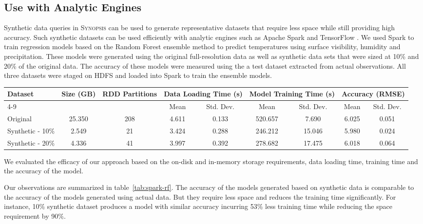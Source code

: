 \subsection{Use with Analytic Engines}
Synthetic data queries in \textsc{Synopsis} can be used to generate representative datasets that require less space while still providing high accuracy.  
Such synthetic datasets can be used efficiently with analytic engines such as Apache Spark \cite{zaharia2010spark} and TensorFlow \cite{tensorflow}.  
We used Spark to train regression models based on the Random Forest ensemble method to predict temperatures using surface visibility, humidity and precipitation.
These models were generated using the original full-resolution data as well as synthetic data sets that were sized at 10\% and 20\% of the original data.
The accuracy of these models were measured using the a test dataset extracted from actual observations.
All three datasets were staged on HDFS and loaded into Spark to train the ensemble models.
%
\begin{table*}
    \renewcommand{\arraystretch}{1.3}
    \caption{Comparing Random Forest based regression models generated by Spark MLlib using synthetic vs. real data}
    \label{tab:spark-rf}
    \begin{center}
        \begin{tabularx}{\textwidth}{|X|c|c|c|c|c|c|c|c|}
            \hline
            \multirow{2}{*}{Dataset} & \multirow{2}{*}{Size (GB)} & \multirow{2}{*}{RDD Partitions} & \multicolumn{2}{c|}{\cellcolor[gray]{0.7}Data Loading Time (s)} &\multicolumn{2}{c|}{\cellcolor[gray]{0.7}Model Training Time (s)} & \multicolumn{2}{c|}{\cellcolor[gray]{0.7}Accuracy (RMSE)}\\
            \cline{4-9}
             & & & \cellcolor[gray]{0.9}Mean & \cellcolor[gray]{0.9}Std. Dev.  &  \cellcolor[gray]{0.9}Mean & \cellcolor[gray]{0.9}Std. Dev. &  \cellcolor[gray]{0.9}Mean & \cellcolor[gray]{0.9}Std. Dev. \\
            \hline
            Original & 25.350 & 208 & 4.611 & 0.133 & 520.657 & 7.690 & 6.025 & 0.051 \\
            \hline
            Synthetic - 10\% & 2.549 & 21 & 3.424 & 0.288 & 246.212 & 15.046 & 5.980 & 0.024 \\
            \hline
            Synthetic - 20\% & 4.336 & 41 & 3.997 & 0.392 & 278.682 & 17.475 & 6.018 & 0.064 \\
            \hline
		\end{tabularx}
	\end{center}
\end{table*}
%
We evaluated the efficacy of our approach based on the on-disk and in-memory storage requirements, data loading time, training time and the accuracy of the model.

Our observations are summarized in table~\ref{tab:spark-rf}.
The accuracy of the models generated based on synthetic data is comparable to the accuracy of the models generated using actual data.
But they require less space and reduces the training time significantly.
For instance, 10\% synthetic dataset produces a model with similar accuracy incurring 53\% less training time while reducing the space requirement by 90\%. 
